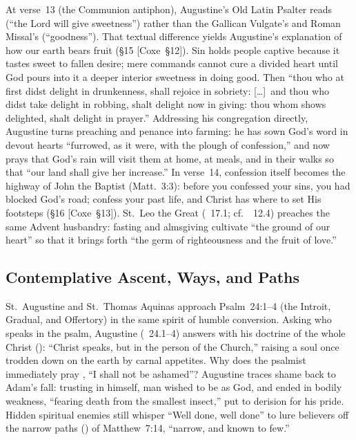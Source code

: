 At verse~13 (the Communion antiphon), Augustine's Old Latin Psalter reads  (``the Lord will give sweetness'') rather than the Gallican Vulgate's and Roman Missal's  (``goodness''). That textual difference yields Augustine's explanation of how our earth bears fruit (\S15 [Coxe~\S12]). Sin holds people captive because it tastes sweet to fallen desire; mere commands cannot cure a divided heart until God pours into it a deeper interior sweetness in doing good. Then ``thou who at first didst delight in drunkenness, shall rejoice in sobriety: [\dots]\ and thou who didst take delight in robbing, shalt delight now in giving: thou whom shows delighted, shalt delight in prayer.'' Addressing his congregation directly, Augustine turns preaching and penance into farming: he has sown God's word in devout hearts ``furrowed, as it were, with the plough of confession,'' and now prays that God's rain will visit them at home, at meals, and in their walks so that ``our land shall give her increase.'' In verse~14, confession itself becomes the highway of John the Baptist (Matt.~3:3): before you confessed your sins, you had blocked God's road; confess your past life, and Christ has where to set His footsteps (\S16 [Coxe~\S13]). St.~Leo the Great (~17.1; cf.~~12.4) preaches the same Advent husbandry: fasting and almsgiving cultivate ``the ground of our heart'' so that it brings forth ``the germ of righteousness and the fruit of love.''

\subsection{Contemplative Ascent, Ways, and Paths}

St.~Augustine and St.~Thomas Aquinas approach Psalm~24:1--4 (the Introit, Gradual, and Offertory) in the same spirit of humble conversion. Asking who speaks in the psalm, Augustine (~24.1--4) answers with his doctrine of the whole Christ (): ``Christ speaks, but in the person of the Church,'' raising a soul once trodden down on the earth by carnal appetites. Why does the psalmist immediately pray , ``I shall not be ashamed''? Augustine traces shame back to Adam's fall: trusting in himself, man wished to be as God, and ended in bodily weakness, ``fearing death from the smallest insect,'' put to derision for his pride. Hidden spiritual enemies still whisper ``Well done, well done'' to lure believers off the narrow paths () of Matthew~7:14, ``narrow, and known to few.''

